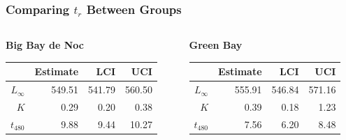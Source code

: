 \documentclass[xcolor=dvipsnames,t]{beamer}\usepackage[]{graphicx}\usepackage[]{color}
\begin{document}
\begin{frame}[fragile]
\frametitle{Comparing $t_{r}$ Between Groups}
\begin{columns}
\begin{column}{0.5\textwidth}
\textbf{Big Bay de Noc}
\begin{table}[ht]
\centering
\begin{tabular}{rrrr}
  \hline
 & Estimate & LCI & UCI \\ 
  \hline
$L_{\infty}$ & 549.51 & 541.79 & 560.50 \\ 
  $K$ & 0.29 & 0.20 & 0.38 \\ 
   \rowcolor{light-gray}$t_{480}$ & 9.88 & 9.44 & 10.27 \\ 
   \hline
\end{tabular}
\end{table}

\end{column}
\begin{column}{0.5\textwidth}
\textbf{Green Bay}
\begin{table}[ht]
\centering
\begin{tabular}{rrrr}
  \hline
 & Estimate & LCI & UCI \\ 
  \hline
$L_{\infty}$ & 555.91 & 546.84 & 571.16 \\ 
  $K$ & 0.39 & 0.18 & 1.23 \\ 
   \rowcolor{light-gray}$t_{480}$ & 7.56 & 6.20 & 8.48 \\ 
   \hline
\end{tabular}
\end{table}

\end{column}
\end{columns}
\end{frame}
\end{document}
